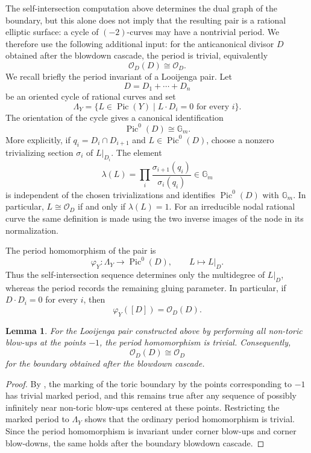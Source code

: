 \documentclass[11pt, reqno]{amsart}
\newtheorem{lemma}[theorem]{Lemma}
\theoremstyle{definition}
\begin{document}
The self-intersection computation above determines the dual graph of the
boundary, but this alone does not imply that the resulting pair is a
rational elliptic surface: a cycle of $(-2)$-curves may have a nontrivial
period.  We therefore use the following additional input: for the anticanonical divisor $D$ obtained after the
blowdown cascade, the period is trivial, equivalently
\[
\mathcal{O}_{D}(D)\cong \mathcal{O}_{D}.
\]
We recall briefly the period invariant of a Looijenga pair.  Let
\[
D=D_1+\cdots+D_n
\]
be an oriented cycle of rational curves and set
\[
\Lambda_Y
=
\bigl\{
L\in\operatorname{Pic}(Y)
\;\big|\;
L\cdot D_i=0\text{ for every }i
\bigr\}.
\]
The orientation of the cycle gives a canonical identification
\[
\operatorname{Pic}^0(D)\cong\mathbb G_m.
\]
More explicitly, if \(q_i=D_i\cap D_{i+1}\) and
\(L\in\operatorname{Pic}^0(D)\), choose a nonzero trivializing section
\(\sigma_i\) of \(L|_{D_i}\).  The element
\[
\lambda(L)
=
\prod_i
\frac{\sigma_{i+1}(q_i)}{\sigma_i(q_i)}
\in\mathbb G_m
\]
is independent of the chosen trivializations and identifies
\(\operatorname{Pic}^0(D)\) with \(\mathbb G_m\).  In particular,
\(L\cong\mathcal O_D\) if and only if \(\lambda(L)=1\).  For an
irreducible nodal rational curve the same definition is made using the
two inverse images of the node in its normalization.

The period homomorphism of the pair is
\[
\varphi_Y:\Lambda_Y\longrightarrow\operatorname{Pic}^0(D),
\qquad
L\longmapsto L|_D.
\]
Thus the self-intersection sequence determines only the multidegree of
\(L|_D\), whereas the period records the remaining gluing parameter.
In particular, if \(D\cdot D_i=0\) for every \(i\), then
\[
\varphi_Y([D])=\mathcal O_D(D).
\]

\begin{lemma}
For the Looijenga pair constructed above by performing all non-toric
blow-ups at the points \(-1\), the period homomorphism is trivial.
Consequently,
\[
\mathcal O_D(D)\cong\mathcal O_D
\]
for the boundary obtained after the blowdown cascade.
\end{lemma}

\begin{proof}
By \cite[Lemma~2.8(1) and Proposition~2.9]{GHKModuli}, the marking
of the toric boundary by the points corresponding to $-1$ has trivial
marked period, and this remains true after any sequence of possibly
infinitely near non-toric blow-ups centered at these points. Restricting
the marked period to $\Lambda_Y$ shows that the ordinary period
homomorphism is trivial. Since the period homomorphism is invariant under
corner blow-ups and corner blow-downs, the same holds after the boundary
blowdown cascade.
\end{proof}
\end{document}

